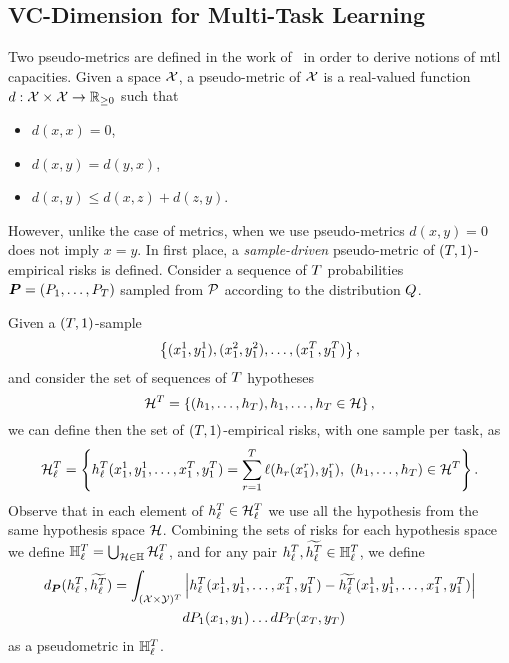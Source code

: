\subsection{VC-Dimension for Multi-Task Learning}

Two pseudo-metrics are defined in the work of~\citet{baxter2000model} in order to derive notions of \acrshort{mtl} capacities.
Given a space $\mathcal{X}$, a pseudo-metric of $\mathcal{X}$ is a real-valued function $d: \mathcal{X} \times \mathcal{X} \to \mathbb{R}_{\geq 0}$ such that 
\begin{itemize}
    \item $d(x, x) = 0$,
    \item $d(x, y) = d(y, x)$,
    \item $d(x, y) \leq d(x, z) + d(z, y)$.
\end{itemize}
However, unlike the case of metrics, when we use pseudo-metrics $d(x, y)  = 0$ does not imply $x=y$.
In first place, a \emph{sample-driven} pseudo-metric of $(T, 1)$-empirical risks is defined.
Consider a sequence of $T$ probabilities $\bm{P} = (P_1, \ldots, P_T)$ sampled from $\mathcal{P}$ according to the distribution $Q$. 
\begin{definition}
    \label{def:sample_pseudometric}
    Given a $(T, 1)$-sample 
    $$\left\{(x_1^1, y_1^1), (x_1^2, y_1^2), \ldots, (x_1^T, y_1^T) \right\},$$
    and consider the set of sequences of $T$ hypotheses 
$$\mathcal{H}^T = \left\{ (h_1, \ldots, h_T) , h_1, \ldots, h_T \in \mathcal{H}\right\} ,$$
 we can define then the set of $(T, 1)$-empirical risks, with one sample per task, as 
$$
\mathcal{H}^T_\ell = \left\{ {h}^T_\ell(x_1^1, y_1^1, \ldots, x_1^T, y_1^T) = \sum_{r=1}^T \ell(h_r(x_1^r), y_1^r) ,\;  (h_1, \ldots, h_T) \in \mathcal{H}^T\right\} .
$$
Observe that in each element of ${h}^T_\ell \in \mathcal{H}^T_\ell$ we use all the hypothesis from the same hypothesis space $\mathcal{H}$.
Combining the sets of risks for each hypothesis space we define $\mathbb{H}^{T}_\ell = \bigcup_{\mathcal{H} \in \mathbb{H}} \mathcal{H}^T_\ell$, and for any pair ${h}^T_\ell, \widetilde{h^T_\ell} \in \mathbb{H}_\ell^T$, we define
\begin{equation}
    \nonumber
    \begin{aligned}
        d_{\bm{P}}({h}^T_\ell, \widetilde{h^T_\ell}) = \int_{(\mathcal{X} \times \mathcal{Y})^{T}} &\left|{h}^T_\ell(x_1^1, y_1^1, \ldots, x_1^T, y_1^T) - \widetilde{h^T_\ell} (x_1^1, y_1^1, \ldots, x_1^T, y_1^T)\right| \\ 
        & d{P_1}(x_1, y_1) \ldots d{P_T}(x_T, y_T)
    \end{aligned}
\end{equation}
as a pseudometric in $\mathbb{H}_\ell^T$.
\end{definition}
